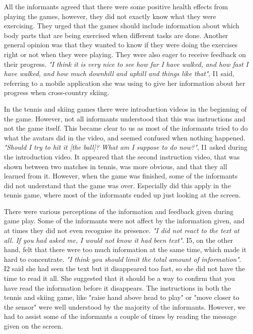 All the informants agreed that there were some positive health effects from playing the games, however, they did not exactly know what they were exercising. They urged that the games should include information about which body parts that are being exercised when different tasks are done. Another general opinion was that they wanted to know if they were doing the exercises right or not when they were playing. They were also eager to receive feedback on their progress. \emph{"I think it is very nice to see how far I have walked, and how fast I have walked, and how much downhill and uphill and things like that"}, I1 said, referring to a mobile application she was using to give her information about her progress when cross-country skiing.   

In the tennis and skiing games there were introduction videos in the beginning of the game. However, not all informants understood that this was instructions and not the game itself. This became clear to us as most of the informants tried to do what the avatars did in the video, and seemed confused when nothing happened. \emph{"Should I try to hit it [the ball]? What am I suppose to do now?"}, I1 asked during the introduction video. It appeared that the second instruction video, that was shown between two matches in tennis, was more obvious, and that they all learned from it. However, when the game was finished, some of the informants did not understand that the game was over. Especially did this apply in the tennis game, where most of the informants ended up just looking at the screen. 

There were various perceptions of the information and feedback given during game play. Some of the informants were not affect by the information given, and at times they did not even recognise its presence. \emph{"I did not react to the text at all. If you had asked me, I would not know it had been text"}. I5, on the other hand, felt that there were too much information at the same time, which made it hard to concentrate. \emph{"I think you should limit the total amount of information"}. I2 said she had seen the text but it disappeared too fast, so she did not have the time to read it all. She suggested that it should be a way to confirm that you have read the information before it disappears. The instructions in both the tennis and skiing game, like "raise hand above head to play" or "move closer to the sensor" were well understood by the majority of the informants. However, we had to assist some of the informants a couple of times by reading the message given on the screen.  

